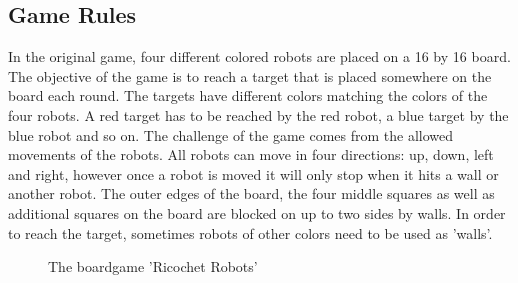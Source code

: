 \documentclass[a4paper,10pt]{article}
\begin{document}
  \subsection{Game Rules}
  \label{subsec:gameRules}
  In the original game, four different colored robots are placed on a 16 by 16 board.
  The objective of the game is to reach a target that is placed somewhere on the board each round. The targets have different colors matching the colors of the four robots.
  A red target has to be reached by the red robot, a blue target by the blue robot and so on. The challenge of the game comes from the allowed movements of the robots. All
  robots can move in four directions: up, down, left and right, however once a robot is moved it will only stop when it hits a wall or another robot. The outer edges of the
  board, the four middle squares as well as additional squares on the board are blocked on up to two sides by walls. In order to reach the target, sometimes robots of other colors
  need to be used as 'walls'.
  \begin{figure}[!htb]
  \caption{The boardgame 'Ricochet Robots'}
  \label{fig:originalgame}
  \end{figure}
\end{document}
